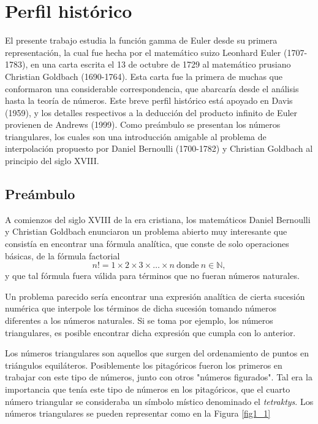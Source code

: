 %
%
\chapter{Perfil histórico}

El presente trabajo estudia la función gamma de Euler desde su primera representación, la cual fue hecha por el matemático suizo Leonhard Euler (1707-1783), en una carta escrita el 13 de octubre de 1729 al matemático prusiano Christian Goldbach (1690-1764). Esta carta fue la primera de muchas que conformaron una considerable correspondencia, que abarcaría desde el análisis hasta la teoría de números. Este breve perfil histórico está apoyado en Davis (1959), y los detalles respectivos a la deducción del producto infinito de Euler provienen de Andrews (1999). Como preámbulo se presentan los números triangulares, los cuales son una introducción amigable al problema de interpolación propuesto por Daniel Bernoulli (1700-1782) y Christian Goldbach al principio del siglo XVIII.

\section{Preámbulo}

A comienzos del siglo XVIII de la era cristiana, los matemáticos Daniel Bernoulli y Christian Goldbach enunciaron un problema abierto muy interesante que consistía en encontrar una fórmula analítica, que conste de solo operaciones básicas, de la fórmula factorial $$n! = 1\times 2\times 3 \times \dots \times n \ \textrm{donde} \ n\in\mathbb{N},$$
y que tal fórmula fuera válida para términos que no fueran números naturales.

Un problema parecido sería encontrar una expresión analítica de cierta sucesión numérica que interpole los términos de dicha sucesión tomando números diferentes a los números naturales. Si se toma por ejemplo, los números triangulares, es posible encontrar dicha expresión que cumpla con lo anterior.

Los números triangulares son aquellos que surgen del ordenamiento de puntos en triángulos equiláteros. Posiblemente los pitagóricos fueron los primeros en trabajar con este tipo de números, junto con otros "números figurados". Tal era la importancia que tenía este tipo de números en los pitagóricos, que el cuarto número triangular se consideraba un símbolo místico denominado el \textit{tetraktys}. Los números triangulares se pueden representar como en la Figura \ref{fig1_1}

